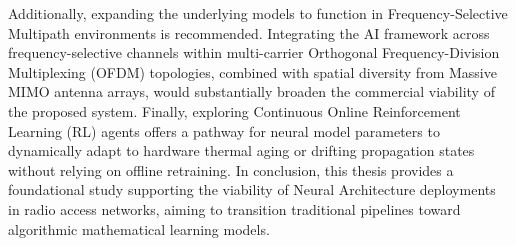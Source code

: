 \documentclass[a4paper,14pt]{extreport}
\begin{document}
Additionally, expanding the underlying models to function in Frequency-Selective Multipath environments is recommended. Integrating the AI framework across frequency-selective channels within multi-carrier Orthogonal Frequency-Division Multiplexing (OFDM) topologies, combined with spatial diversity from Massive MIMO antenna arrays, would substantially broaden the commercial viability of the proposed system. Finally, exploring Continuous Online Reinforcement Learning (RL) agents offers a pathway for neural model parameters to dynamically adapt to hardware thermal aging or drifting propagation states without relying on offline retraining. In conclusion, this thesis provides a foundational study supporting the viability of Neural Architecture deployments in radio access networks, aiming to transition traditional pipelines toward algorithmic mathematical learning models.
\end{document}
